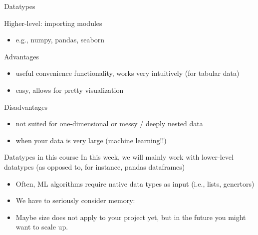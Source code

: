 \documentclass[compress]{beamer}
\begin{document}
\begin{frame}{Datatypes}
\begin{block}{Higher-level: importing modules}
	\begin{itemize}[<+->]
		\item e.g., numpy, pandas, seaborn 
	\end{itemize}
\end{block}
\pause
\begin{exampleblock}{Advantages}
	\begin{itemize}[<+->]
		\item useful convenience functionality, works very intuitively (for tabular data)
		\item easy, allows for pretty visualization
	\end{itemize}
\end{exampleblock}
\pause
\begin{alertblock}{Disadvantages }
	\begin{itemize}[<+->]
		\item not suited for one-dimensional or messy / deeply nested data
		\item when your data is very large (machine learning!!)
	\end{itemize}
\end{alertblock}
\end{frame}

\begin{frame}{Datatypes in this course}
In this week, we will mainly work with lower-level datatypes (as opposed to, for instance, pandas dataframes)
\begin{itemize}[<+->]
	\item Often, ML algorithms require native data types as input (i.e., lists, genertors)
	\item We have to seriously consider memory:
	\item Maybe size does not apply to your project yet, but in the future you might want to scale up. 
\end{itemize}	
\end{frame}
\end{document}
